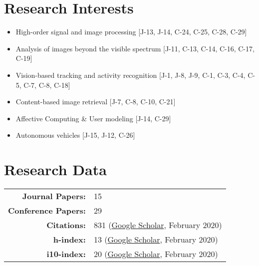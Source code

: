 \documentclass[a4paper,10pt]{article}
\begin{document}
\section{Research Interests}
\begin{itemize}
	\item High-order signal and image processing [J-13, J-14, C-24, C-25, C-28, C-29]
	\item Analysis of images beyond the visible spectrum [J-11, C-13, C-14, C-16, C-17, C-19]
	\item Vision-based tracking and activity recognition [J-1, J-8, J-9, C-1, C-3, C-4, C-5, C-7, C-8, C-18]
	\item Content-based image retrieval [J-7, C-8, C-10, C-21]
	\item Affective Computing \& User modeling [J-14, C-29]
	\item Autonomous vehicles [J-15, J-12, C-26]
\end{itemize}

\vspace{0.2in}
\section{Research Data}
\begin{tabular}{rl}
\textbf{Journal Papers:}& 15\\
\textbf{Conference Papers:}& 29\\
\textbf{Citations:}& 831 (\href{https://scholar.google.gr/citations?hl=en&user=GYOp9v8AAAAJ&view_op=list_works&sortby=pubdate}{Google Scholar}, February 2020)\\
\textbf{h-index:}& 13 (\href{https://scholar.google.gr/citations?hl=en&user=GYOp9v8AAAAJ&view_op=list_works&sortby=pubdate}{Google Scholar}, February 2020)\\
\textbf{i10-index:}& 20 (\href{https://scholar.google.gr/citations?hl=en&user=GYOp9v8AAAAJ&view_op=list_works&sortby=pubdate}{Google Scholar}, February 2020)\\
\end{tabular}

\vspace{0.2in}
\end{document}
